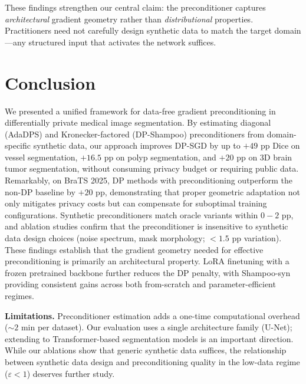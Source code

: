 \documentclass[runningheads]{llncs}
\begin{document}
These findings strengthen our central claim: the preconditioner captures \emph{architectural} gradient geometry rather than \emph{distributional} properties. Practitioners need not carefully design synthetic data to match the target domain---any structured input that activates the network suffices.

\section{Conclusion}
\label{sec:conclusion}

We presented a unified framework for data-free gradient preconditioning in differentially private medical image segmentation. By estimating diagonal (AdaDPS) and Kronecker-factored (DP-Shampoo) preconditioners from domain-specific synthetic data, our approach improves DP-SGD by up to $+49$ pp Dice on vessel segmentation, $+16.5$ pp on polyp segmentation, and $+20$ pp on 3D brain tumor segmentation, without consuming privacy budget or requiring public data. Remarkably, on BraTS 2025, DP methods with preconditioning outperform the non-DP baseline by $+20$ pp, demonstrating that proper geometric adaptation not only mitigates privacy costs but can compensate for suboptimal training configurations. Synthetic preconditioners match oracle variants within $0{-}2$ pp, and ablation studies confirm that the preconditioner is insensitive to synthetic data design choices (noise spectrum, mask morphology; $<1.5$ pp variation). These findings establish that the gradient geometry needed for effective preconditioning is primarily an architectural property. LoRA finetuning with a frozen pretrained backbone further reduces the DP penalty, with Shampoo-syn providing consistent gains across both from-scratch and parameter-efficient regimes.

\textbf{Limitations.} Preconditioner estimation adds a one-time computational overhead (${\sim}2$ min per dataset). Our evaluation uses a single architecture family (U-Net); extending to Transformer-based segmentation models is an important direction. While our ablations show that generic synthetic data suffices, the relationship between synthetic data design and preconditioning quality in the low-data regime ($\varepsilon{<}1$) deserves further study.



\end{document}

